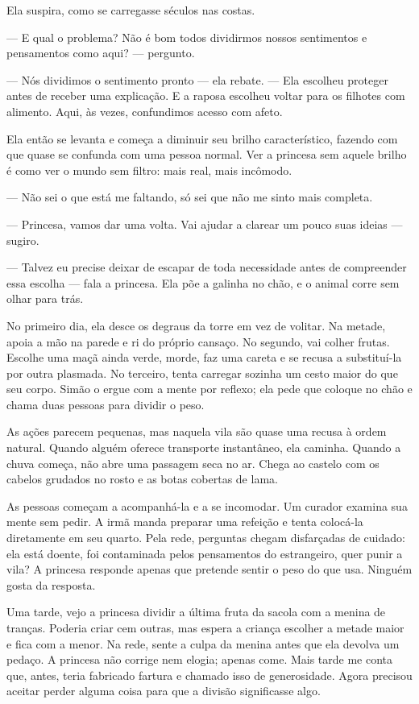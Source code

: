 Ela suspira, como se carregasse séculos nas costas.

— E qual o problema? Não é bom todos dividirmos nossos sentimentos e pensamentos como aqui? — pergunto.

— Nós dividimos o sentimento pronto — ela rebate. — Ela escolheu proteger antes de receber uma explicação. E a raposa escolheu voltar para os filhotes com alimento. Aqui, às vezes, confundimos acesso com afeto.

Ela então se levanta e começa a diminuir seu brilho característico, fazendo com que quase se confunda com uma pessoa normal. Ver a princesa sem aquele brilho é como ver o mundo sem filtro: mais real, mais incômodo.

— Não sei o que está me faltando, só sei que não me sinto mais completa.

— Princesa, vamos dar uma volta. Vai ajudar a clarear um pouco suas ideias — sugiro.

— Talvez eu precise deixar de escapar de toda necessidade antes de compreender essa escolha — fala a princesa. Ela põe a galinha no chão, e o animal corre sem olhar para trás.

No primeiro dia, ela desce os degraus da torre em vez de volitar. Na metade, apoia a mão na parede e ri do próprio cansaço. No segundo, vai colher frutas. Escolhe uma maçã ainda verde, morde, faz uma careta e se recusa a substituí-la por outra plasmada. No terceiro, tenta carregar sozinha um cesto maior do que seu corpo. Simão o ergue com a mente por reflexo; ela pede que coloque no chão e chama duas pessoas para dividir o peso.

As ações parecem pequenas, mas naquela vila são quase uma recusa à ordem natural. Quando alguém oferece transporte instantâneo, ela caminha. Quando a chuva começa, não abre uma passagem seca no ar. Chega ao castelo com os cabelos grudados no rosto e as botas cobertas de lama.

As pessoas começam a acompanhá-la e a se incomodar. Um curador examina sua mente sem pedir. A irmã manda preparar uma refeição e tenta colocá-la diretamente em seu quarto. Pela rede, perguntas chegam disfarçadas de cuidado: ela está doente, foi contaminada pelos pensamentos do estrangeiro, quer punir a vila? A princesa responde apenas que pretende sentir o peso do que usa. Ninguém gosta da resposta.

Uma tarde, vejo a princesa dividir a última fruta da sacola com a menina de tranças. Poderia criar cem outras, mas espera a criança escolher a metade maior e fica com a menor. Na rede, sente a culpa da menina antes que ela devolva um pedaço. A princesa não corrige nem elogia; apenas come. Mais tarde me conta que, antes, teria fabricado fartura e chamado isso de generosidade. Agora precisou aceitar perder alguma coisa para que a divisão significasse algo.


